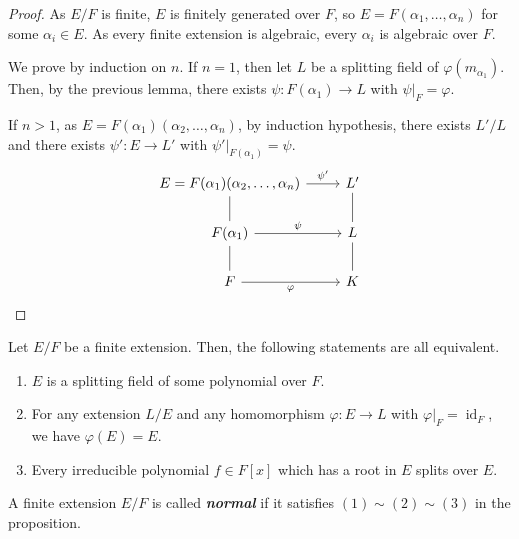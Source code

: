 \documentclass[twoside]{article}
\DeclareMathOperator\id{id}
\theoremstyle{remark}
\newcommand*\term[1]{\textbf{\textit{\mathversion{bold}#1}}}
\begin{document}
\begin{proof}
  As \(E/F\) is finite, \(E\) is finitely generated over \(F\), so \(E=F(\alpha_1, \dots, \alpha_n)\) for some \(\alpha_i \in E\). As every finite extension is algebraic, every \(\alpha_i\) is algebraic over \(F\).
  
  We prove by induction on \(n\). If \(n=1\), then let \(L\) be a splitting field of \(\varphi(m_{\alpha_1})\). Then, by the previous lemma, there exists \(\psi\colon F(\alpha_1) \to L\) with \(\psi|_F = \varphi\).
  
  If \(n>1\), as \(E = F(\alpha_1) (\alpha_2, \dots, \alpha_n)\), by induction hypothesis, there exists \(L'/L\) and there exists \(\psi'\colon E \to L'\) with \(\psi'|_{F(\alpha_1)} = \psi\). 
  \begin{displaymath}
    \begin{tikzcd}
      E=F(\alpha_1)(\alpha_2,\dots,\alpha_n) \rar["\psi'"]\dar[dash] & L'\dar[dash] \\
      F(\alpha_1) \rar["\psi"]\dar[dash] & L\dar[dash] \\
      F\rar["\varphi"swap] & K
    \end{tikzcd}\qedhere
  \end{displaymath}
\end{proof}

\begin{proposition}
  Let \(E/F\) be a finite extension. Then, the following statements are all equivalent.
  \begin{enumerate}[label=\textup{(\arabic*)}, nosep]
    \item \(E\) is a splitting field of some polynomial over \(F\).
    \item For any extension \(L/E\) and any homomorphism \(\varphi\colon E \to L\) with \(\varphi|_F = \id_F\), we have \(\varphi(E) = E\).
    \item Every irreducible polynomial \(f \in F[x]\) which has a root in \(E\) splits over \(E\).
  \end{enumerate}
\end{proposition}

\begin{definition}
  A finite extension \(E/F\) is called \term{normal} if it satisfies \((1)\sim(2)\sim(3)\) in the proposition.
\end{definition}
\end{document}
